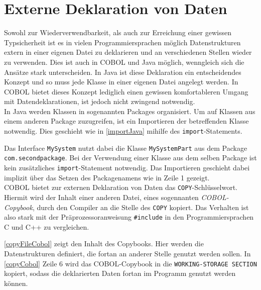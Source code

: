 \section{Externe Deklaration von Daten}

Sowohl zur Wiederverwendbarkeit, als auch zur Erreichung einer gewissen Typsicherheit ist es in vielen Programmiersprachen möglich Datenstrukturen extern in einer eigenen Datei zu deklarieren und an verschiedenen Stellen wieder zu verwenden. Dies ist auch in COBOL und Java möglich, wenngleich sich die Ansätze stark unterscheiden. In Java ist diese Deklaration ein entscheidendes Konzept und so muss jede Klasse in einer eigenen Datei angelegt werden. In COBOL bietet dieses Konzept lediglich einen gewissen komfortableren Umgang mit Datendeklarationen, ist jedoch nicht zwingend notwendig.\\

In Java werden Klassen in sogenannten Packages organisiert. Um auf Klassen aus einem anderen Package zuzugreifen, ist ein Importieren der betreffenden Klasse notwendig. Dies geschieht wie in \autoref{importJava} mihilfe des \texttt{import}-Statements.\\


Das Interface \texttt{MySystem} nutzt dabei die Klasse \texttt{MySystemPart} aus dem Package \texttt{com.secondpackage}. Bei der Verwendung einer Klasse aus dem selben Package ist kein zusätzliches \texttt{import}-Statement notwendig. Das Importieren geschieht dabei implizit über das Setzen des Packagenamens wie in Zeile 1 gezeigt.\\

COBOL bietet zur externen Deklaration von Daten das \texttt{COPY}-Schlüsselwort. Hiermit wird der Inhalt einer anderen Datei, eines sogennanten \textit{COBOL-Copybook}, durch den Compiler an die Stelle des \texttt{COPY} kopiert. Das Verhalten ist also stark mit der Präprozessoranweisung \texttt{#include} in den Programmiersprachen C und C++ zu vergleichen.



\autoref{copyFileCobol} zeigt den Inhalt des Copybooks. Hier werden die Datenstrukturen definiert, die fortan an anderer Stelle genutzt werden sollen. In \autoref{copyCobol} Zeile 6 wird das COBOL-Copybook in die \texttt{WORKING-STORAGE SECTION} kopiert, sodass die deklarierten Daten fortan im Programm genutzt werden können.

